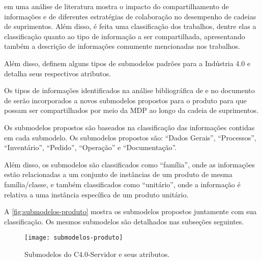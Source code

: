  em uma análise de literatura mostra o impacto do compartilhamento de informações e de diferentes estratégias de colaboração no desempenho de cadeias de suprimentos. Além disso, é feita uma classificação dos trabalhos, dentre elas a classificação quanto ao tipo de informação a ser compartilhada, apresentando também a descrição de informações comumente mencionadas nos trabalhos.

Além disso,  definem alguns tipos de submodelos padrões para a Indústria 4.0 e detalha seus respectivos atributos.

Os tipos de informações identificados na análise bibliográfica de  e no documento de  serão incorporados a novos submodelos propostos para o produto para que possam ser compartilhados por meio da MDP ao longo da cadeia de suprimentos.

Os submodelos propostos são baseados na classificação das informações contidas em cada submodelo. Os submodelos propostos são: ``Dados Gerais'', ``Processos'', ``Inventário'', ``Pedido'', ``Operação'' e ``Documentação''.

Além disso, os submodelos são classificados como ``família'', onde as informações estão relacionadas a um conjunto de instâncias de um produto de mesma família/classe, e também classificados como ``unitário'', onde a informação é relativa a uma instância específica de um produto unitário.

A \autoref{fig:submodelos-produto} mostra os submodelos propostos juntamente com sua classificação. Os mesmos submodelos são detalhados nas subseções seguintes.

\begin{figure}[htb!]
	\centering
	\texttt{[image: submodelos-produto]}
	\caption{Submodelos do C4.0-Servidor e seus atributos.}
	\label{fig:submodelos-produto}
\end{figure}

\newpage



